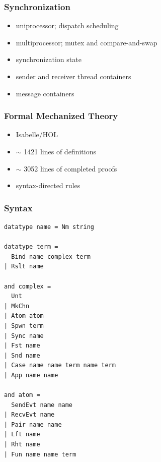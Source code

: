 \documentclass{beamer}
\begin{document}
\begin{frame}
\frametitle{Synchronization}
\begin{itemize}
\item uniprocessor; dispatch scheduling
\item multiprocessor; mutex and compare-and-swap
\item synchronization state
\item sender and receiver thread containers
\item message containers
\end{itemize}
\end{frame}

\begin{frame}[fragile]
	\frametitle{Formal Mechanized Theory}
\begin{itemize}
\item Isabelle/HOL  
\item $\sim$ 1421 lines of definitions  
\item $\sim$ 3052 lines of completed proofs 
\item syntax-directed rules
\end{itemize}
\end{frame}



\begin{frame}[fragile]
	\frametitle{Syntax}
\begin{lstlisting}[language=logic, mathescape]
datatype name = Nm string

datatype term = 
  Bind name complex term 
| Rslt name

and complex = 
  Unt
| MkChn
| Atom atom
| Spwn term 
| Sync name
| Fst name
| Snd name
| Case name name term name term 
| App name name

and atom = 
  SendEvt name name
| RecvEvt name
| Pair name name
| Lft name
| Rht name
| Fun name name term 
\end{lstlisting}
\end{frame}
\end{document}
